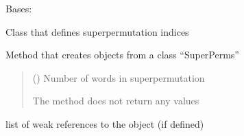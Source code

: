 \documentclass[letterpaper,10pt,english]{sphinxmanual}
\begin{document}
\begin{fulllineitems}
\label{\detokenize{super_permutations:super_permutations.SuperPerms}}
\pysigstartsignatures
{}
\pysigstopsignatures
\sphinxAtStartPar
Bases: 

\sphinxAtStartPar
Class that defines superpermutation indices

\begin{fulllineitems}
\label{\detokenize{super_permutations:super_permutations.SuperPerms.__init__}}
\pysigstartsignatures
{}
\pysigstopsignatures
\sphinxAtStartPar
Method that creates objects from a class “SuperPerms”
\begin{quote}\begin{description}
\sphinxAtStartPar
{} () \textendash{} Number of words in superpermutation

\sphinxAtStartPar
The method does not return any values

\end{description}\end{quote}

\end{fulllineitems}


\begin{fulllineitems}
\label{\detokenize{super_permutations:super_permutations.SuperPerms.__weakref__}}
\pysigstartsignatures
{}
\pysigstopsignatures
\sphinxAtStartPar
list of weak references to the object (if defined)

\end{fulllineitems}



\end{fulllineitems}
\end{document}
